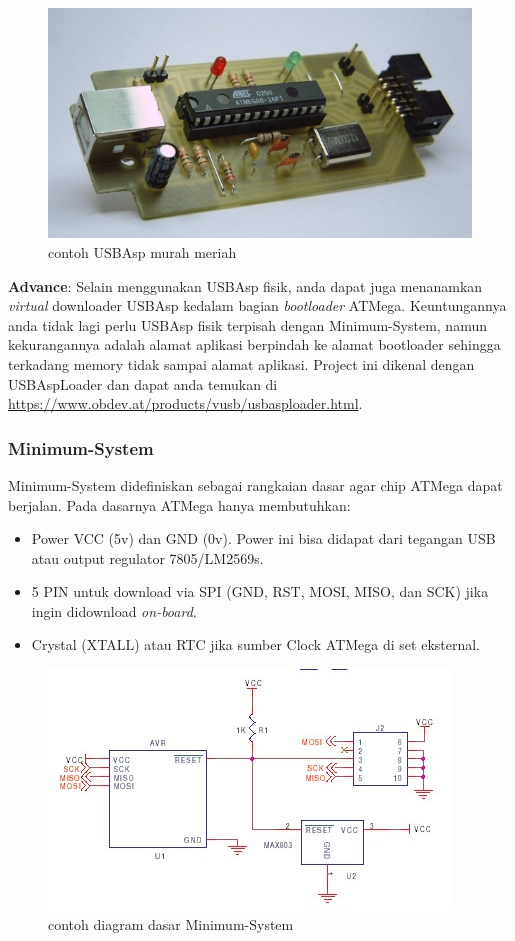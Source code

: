 \documentclass[12pt,]{article}
\begin{document}
	\begin{figure}[H]
		\centering
		\includegraphics[width=0.6\linewidth]{images/usbasphard}
		\caption{contoh USBAsp murah meriah}
	\end{figure}

	\textbf{Advance}: Selain menggunakan USBAsp fisik, anda dapat juga menanamkan \textit{virtual} downloader USBAsp kedalam bagian \textit{bootloader} ATMega.
	Keuntungannya anda tidak lagi perlu USBAsp fisik terpisah dengan Minimum-System,
	namun kekurangannya adalah alamat aplikasi berpindah ke alamat bootloader sehingga terkadang memory tidak sampai alamat aplikasi.
	Project ini dikenal dengan USBAspLoader dan dapat anda temukan di \url{https://www.obdev.at/products/vusb/usbasploader.html}.
	
	\subsubsection{Minimum-System}
	Minimum-System didefiniskan sebagai rangkaian dasar agar chip ATMega dapat berjalan.
	Pada dasarnya ATMega hanya membutuhkan:
	\begin{itemize}
		\item Power VCC (5v) dan GND (0v). Power ini bisa didapat dari tegangan USB atau output regulator 7805/LM2569s.
		\item 5 PIN untuk download via SPI (GND, RST, MOSI, MISO, dan SCK) jika ingin didownload \textit{on-board}.
		\item Crystal (XTALL) atau RTC jika sumber Clock ATMega di set eksternal.
	\end{itemize}

	\begin{figure}[H]
		\centering
		\includegraphics[width=0.6\linewidth]{images/minsys}
		\caption{contoh diagram dasar Minimum-System}
	\end{figure}
\end{document}
